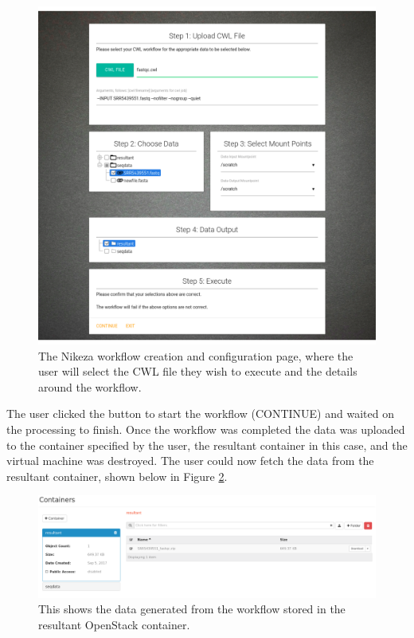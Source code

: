 \begin{figure}[h!]
\centering
\includegraphics[width=\textwidth]{Figures/4_os_config.png}
\decoRule
\caption[Nikeza Workflow Configuration Screen]{The Nikeza workflow creation and configuration page, where the user will select the CWL file they wish to execute and the details around the workflow.}
\label{fig:os_conf}
\end{figure}

The user clicked the button to start the workflow (CONTINUE) and waited on the processing to finish. Once the workflow was completed the data was uploaded to the container specified by the user, the resultant container in this case, and the virtual machine was destroyed. The user could now fetch the data from the resultant container, shown below in Figure \ref{fig:os_result}.

\begin{figure}[h!]
\centering
\includegraphics[width=\textwidth]{Figures/4_os_swift_result.png}
\decoRule
\caption[OpenStack Swift Container with Result Data]{This shows the data generated from the workflow stored in the resultant OpenStack container.}
\label{fig:os_result}
\end{figure}

